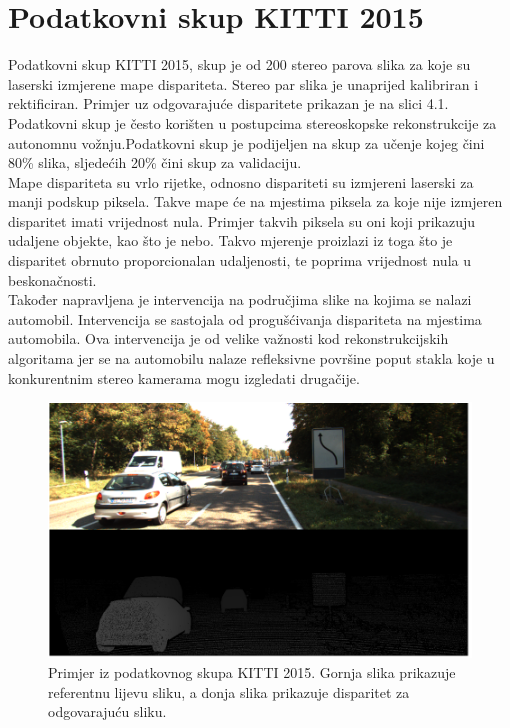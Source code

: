 \documentclass[times, utf8, zavrsni, numeric]{fer}
\begin{document}
\section{Podatkovni skup KITTI 2015}
Podatkovni skup KITTI 2015, skup je od 200 stereo parova slika za koje su laserski izmjerene mape dispariteta. Stereo par slika je unaprijed kalibriran i rektificiran. Primjer uz odgovarajuće disparitete prikazan je na slici 4.1. Podatkovni skup je često korišten u postupcima stereoskopske rekonstrukcije za autonomnu vožnju.Podatkovni skup je podijeljen na skup za učenje kojeg čini 80\% slika, sljedećih 20\% čini skup za validaciju.\\
Mape dispariteta su vrlo rijetke, odnosno dispariteti su izmjereni laserski za manji podskup piksela. Takve mape će na mjestima piksela za koje nije izmjeren disparitet imati vrijednost nula. Primjer takvih piksela su oni koji prikazuju udaljene objekte, kao što je nebo. Takvo mjerenje proizlazi iz toga što je disparitet obrnuto proporcionalan udaljenosti, te poprima vrijednost nula u beskonačnosti. \\
Također napravljena je intervencija na područjima slike na kojima se nalazi automobil. Intervencija se sastojala od progušćivanja dispariteta na mjestima automobila. Ova intervencija je od velike važnosti kod rekonstrukcijskih algoritama jer se na automobilu nalaze refleksivne površine poput stakla koje u konkurentnim stereo kamerama mogu izgledati drugačije.\cite{zbontar}
\begin{figure}[htb]
\centering
\includegraphics[width = 14.5cm]{img/slika11.png}
\caption{Primjer iz podatkovnog skupa KITTI 2015. Gornja slika prikazuje referentnu lijevu sliku, a donja slika prikazuje disparitet za odgovarajuću sliku.}
\label{fig:KITTI}
\end{figure}
\end{document}
